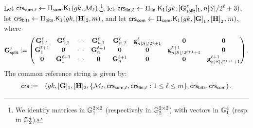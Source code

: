 \begin{description}
Let
$\mathsf{crs}_{\mathsf{sum},\ell} \gets \Pi_{\mathsf{sum}}.\mathsf{K}_1({gk}, \mathcal{M}_\ell)$.\footnote{We identify
matrices in $\mathbb{G}_1^{2 \times 2}$ (respectively in $\mathbb{G}_2^{2 \times 2}$) with vectors in $\mathbb{G}_1^{4}$ (resp. in $\mathbb{G}_2^{4}$).}, let $\mathsf{crs}_{\mathsf{lin},\ell}\gets \Pi_\mathsf{lin}.\mathsf{K}_1(gk;[\mathbf{{G}}^\ell_{\mathsf{split}}]_1,n|S|/2^{\ell}+3)$, let $\mathsf{crs}_{\mathsf{bits}}\gets\Pi_{\mathsf{bits}}.\mathsf{K}_1(gk,[\mathbf{{H}}]_2,m)$, and let $\mathsf{crs}_{\mathsf{com}} \gets \Pi_{\mathsf{com}}.\mathsf{K}_1({gk}, \left[\mathbf{{G}}\right]_1,\left[\mathbf{{H}}\right]_2,m)$, where
$$
\mathbf{{G}}_\mathsf{split}^\ell:=
\begin{pmatrix}
\mathbf{{G}}^{\ell}_{1,1} & \mathbf{{G}}^{\ell}_{1,2} & \cdots & \mathbf{{G}}^{\ell}_{n,1} & \mathbf{{G}}^{\ell}_{n,2} & \mathbf{g}^{\ell}_{n|S|/2^{\ell}+1} & \mathbf{{0}}                       & \mathbf{{0}}\\
\mathbf{{G}}^{\ell+1}_{1} & \mathbf{{0}}           & \cdots & \mathbf{{G}}^{\ell+1}_{n} & \mathbf{{0}}           & \mathbf{{0}}                    &\mathbf{g}^{\ell+1}_{n|S|/2^{\ell+1}+1} & \mathbf{{0}}\\
\mathbf{{0}}           & \mathbf{{G}}^{\ell+1}_{1} & \cdots & \mathbf{{0}}           & \mathbf{{G}}^{\ell+1}_{n} & \mathbf{{0}}                    & \mathbf{{0}}                       & \mathbf{g}^{\ell+1}_{n|S|/2^{\ell+1}+1}
\end{pmatrix}.
$$
The common reference string is given by:
\begin{eqnarray*}
\mathsf{crs}&:=&\left( gk, [\mathbf{{G}}]_1,
    [\mathbf{{H}}]_2, \{\mathcal{M}_\ell,\mathsf{crs}_{\mathsf{sum},\ell},\mathsf{crs}_{\mathsf{lin},\ell}:1\leq \ell\leq m\},\mathsf{crs}_{\mathsf{bits}},\mathsf{crs}_{\mathsf{com}} \right).
 \end{eqnarray*}



\end{description}
